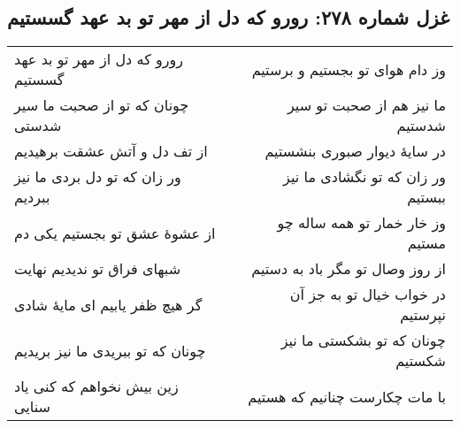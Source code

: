 \begin{center}
\section*{غزل شماره ۲۷۸: رورو که دل از مهر تو بد عهد گسستیم}
\label{sec:278}
\begin{longtable}{l p{0.5cm} r}
رورو که دل از مهر تو بد عهد گسستیم
&&
وز دام هوای تو بجستیم و برستیم
\\
چونان که تو از صحبت ما سیر شدستی
&&
ما نیز هم از صحبت تو سیر شدستیم
\\
از تف دل و آتش عشقت برهیدیم
&&
در سایهٔ دیوار صبوری بنشستیم
\\
ور زان که تو دل بردی ما نیز ببردیم
&&
ور زان که تو نگشادی ما نیز ببستیم
\\
از عشوهٔ عشق تو بجستیم یکی دم
&&
وز خار خمار تو همه ساله چو مستیم
\\
شبهای فراق تو ندیدیم نهایت
&&
از روز وصال تو مگر باد به دستیم
\\
گر هیچ ظفر یابیم ای مایهٔ شادی
&&
در خواب خیال تو به جز آن نپرستیم
\\
چونان که تو ببریدی ما نیز بریدیم
&&
چونان که تو بشکستی ما نیز شکستیم
\\
زین بیش نخواهم که کنی یاد سنایی
&&
با مات چکارست چنانیم که هستیم
\\
\end{longtable}
\end{center}
